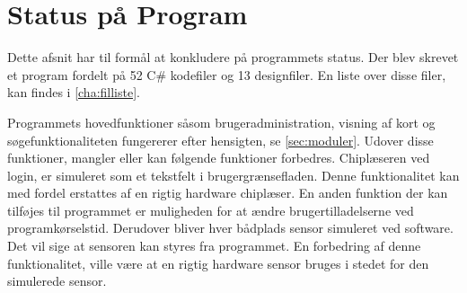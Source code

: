 \section{Status på Program} 
\label{sec:status_p_program}

Dette afsnit har til formål at konkludere på programmets status. Der blev skrevet et program fordelt på 52 C\# kodefiler og 13 designfiler. En liste over disse filer, kan findes i \cref{cha:filliste}. 

Programmets hovedfunktioner såsom brugeradministration, visning af kort og søgefunktionaliteten fungererer efter hensigten, se \cref{sec:moduler}. Udover disse funktioner, mangler eller kan følgende funktioner forbedres. Chiplæseren ved login, er simuleret som et tekstfelt i brugergrænsefladen. Denne funktionalitet kan med fordel erstattes af en rigtig hardware chiplæser. En anden funktion der kan tilføjes til programmet er muligheden for at ændre brugertilladelserne ved programkørselstid. Derudover bliver hver bådplads sensor simuleret ved software. Det vil sige at sensoren kan styres fra programmet. En forbedring af denne funktionalitet, ville være at en rigtig hardware sensor bruges i stedet for den simulerede sensor.





